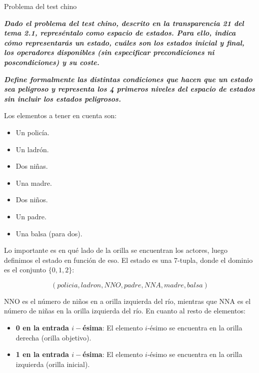 \documentclass[11pt, a4paper, spanish, openright, twoside]{book}
\begin{document}
\begin{section}{Problema del test chino}

\textit{\textbf{Dado el problema del test chino, descrito en la transparencia 21 del tema 2.1, represéntalo como espacio de estados. Para ello, indica cómo representarás un estado, cuáles son los estados inicial y final, los operadores disponibles (sin especificar precondiciones ni poscondiciones) y su coste.}}

\textit{\textbf{Define formalmente las distintas condiciones que hacen que un estado sea peligroso y representa los 4 primeros niveles del espacio de estados sin incluir los estados peligrosos.}}


Los elementos a tener en cuenta son:

\begin{itemize}

	\item Un policía.

	\item Un ladrón.
	
	\item Dos niñas.
	
	\item Una madre.

	\item Dos niños.
	
	\item Un padre. 
	
	\item Una balsa (para dos).

\end{itemize}

Lo importante es en qué lado de la orilla se encuentran los actores, luego definimos el estado en función de eso. El estado es una 7-tupla, donde el dominio es el conjunto $\{0,1,2\}$:

$$\boxed{(policia, ladron, NNO, padre, NNA, madre, balsa)}$$

NNO es el número de niños en a orilla izquierda del río, mientras que NNA es el número de niñas en la orilla izquierda del río. En cuanto al resto de elementos:

\begin{itemize}

	\item \textbf{0 en la entrada $i-$ésima}: El elemento $i$-ésimo se encuentra en la orilla derecha (orilla objetivo). 

	\item \textbf{1 en la entrada $i-$ésima}: El elemento $i$-ésimo se encuentra en la orilla izquierda (orilla inicial).


\end{itemize}
\end{section}
\end{document}
